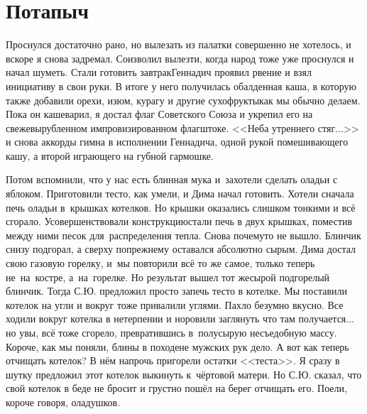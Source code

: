 \chapter{Потапыч} 
\vepsianrose

Проснулся достаточно рано, но вылезать из палатки совершенно не хотелось, и вскоре я снова задремал. Соизволил вылезти, когда народ тоже уже проснулся и начал шуметь. Стали готовить завтрак\mdash Геннадич проявил рвение и взял инициативу в свои руки. В итоге у него получилась обалденная каша, в которую также добавили орехи, изюм, курагу и другие сухофрукты\mdash как мы обычно делаем. Пока он кашеварил, я достал флаг Советского Союза и укрепил его на свежевырубленном импровизированном флагштоке. <<Неба утреннего стяг$\ldots$>> и снова аккорды гимна в исполнении Геннадича, одной рукой помешивающего кашу, а второй играющего на губной гармошке.

Потом вспомнили, что у нас есть блинная мука и~захотели сделать оладьи с яблоком. Приготовили тесто, как умели, и Дима начал готовить. Хотели сначала печь оладьи в~крышках котелков. Но крышки оказались слишком тонкими и всё сгорало. Усовершенствовали конструкцию\mdash стали печь в двух крышках, поместив между ними песок для~распределения тепла. Снова почему\sdash то не вышло. Блинчик снизу подгорал, а сверху по\sdash прежнему оставался абсолютно сырым. Дима достал свою газовую горелку, и~мы повторили всё то же самое, только теперь не~на~костре, а~на~горелке. Но результат вышел тот же\mdash сырой подгорелый блинчик. Тогда С.Ю. предложил просто запечь тесто в котелке. Мы поставили котелок на угли и вокруг тоже привалили углями. Пахло безумно вкусно. Все ходили вокруг котелка в нетерпении и норовили заглянуть что там получается$\ldots$ но увы, всё тоже сгорело, превратившись в~полусырую несъедобную массу. Короче, как мы поняли, блины в походе\mdash не мужских рук дело. А вот как теперь отчищать котелок? В нём напрочь пригорели остатки <<теста>>. Я сразу в шутку предложил этот котелок выкинуть к~чёртовой матери. Но С.Ю. сказал, что свой котелок в беде не бросит и грустно пошёл на берег отчищать его. Поели, короче говоря, оладушков.

